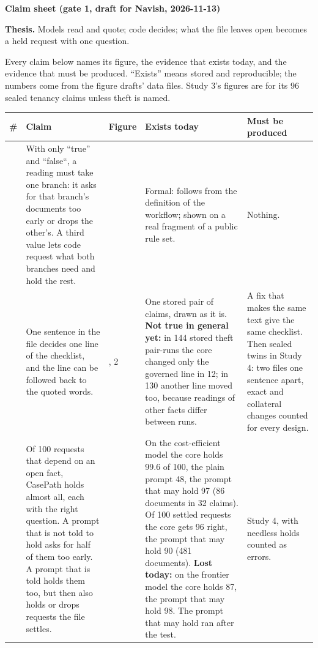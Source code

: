 \documentclass[10pt]{article}
\newenvironment{claimpage}{}{}
\newcommand{\doctitle}[1]{{\large\bfseries #1\par}\vspace{2pt}}
\newcommand{\sect}[1]{\needspace{5\baselineskip}\vspace{3pt}{\bfseries #1\par}\vspace{1pt}}
\begin{document}
\begin{claimpage}\fontsize{9}{10.8}\selectfont\setlength{\tabcolsep}{3.5pt}\renewcommand{\arraystretch}{1.0}\renewcommand{\sect}[1]{\vspace{3pt}{\bfseries #1\par}\vspace{1pt}}\setlength{\parskip}{2pt}
\doctitle{Claim sheet (gate 1, draft for Navish, 2026-11-13)}
\textbf{Thesis.} Models read and quote; code decides; what the file leaves open becomes a held request with one question.

Every claim below names its figure, the evidence that exists today, and the evidence that must be produced. “Exists” means stored and reproducible; the numbers come from the figure drafts' data files. Study 3's figures are for its 96 sealed tenancy claims unless theft is named.

\sect{Question 1. What happens to a fact the file leaves open?}
\begin{tabularx}{\linewidth}{>{\raggedright\arraybackslash}p{0.8em}>{\hsize=0.95\hsize\raggedright\arraybackslash}X>{\raggedright\arraybackslash}p{4.2em}>{\hsize=1.25\hsize\raggedright\arraybackslash}X>{\hsize=0.8\hsize\raggedright\arraybackslash}X}\toprule
\textbf{\#} & \textbf{Claim} & \textbf{Figure} & \textbf{Exists today} & \textbf{Must be produced}\\\midrule
1 & With only “true” and “false“, a reading must take one branch: it asks for that branch's documents too early or drops the other's. A third value lets code request what both branches need and hold the rest. & 3 & Formal: follows from the definition of the workflow; shown on a real fragment of a public rule set. & Nothing.\\
2 & One sentence in the file decides one line of the checklist, and the line can be followed back to the quoted words. & 1, 2 & One stored pair of claims, drawn as it is. \textbf{Not true in general yet:} in 144 stored theft pair-runs the core changed only the governed line in 12; in 130 another line moved too, because readings of other facts differ between runs. & A fix that makes the same text give the same checklist. Then sealed twins in Study 4: two files one sentence apart, exact and collateral changes counted for every design.\\
3 & Of 100 requests that depend on an open fact, CasePath holds almost all, each with the right question. A prompt that is not told to hold asks for half of them too early. A prompt that is told holds them too, but then also holds or drops requests the file settles. & 4 & On the cost-efficient model the core holds 99.6 of 100, the plain prompt 48, the prompt that may hold 97 (86 documents in 32 claims). Of 100 settled requests the core gets 96 right, the prompt that may hold 90 (481 documents). \textbf{Lost today:} on the frontier model the core holds 87, the prompt that may hold 98. The prompt that may hold ran after the test. & Study 4, with needless holds counted as errors.\\
\bottomrule\end{tabularx}


\end{claimpage}
\end{document}

